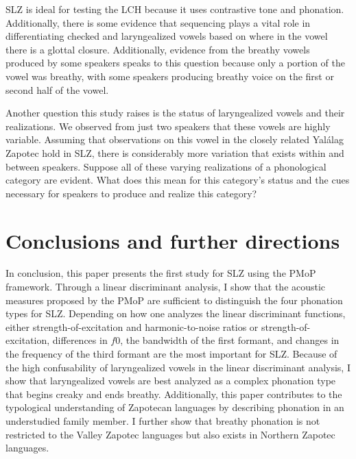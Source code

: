 \documentclass[12pt, letterpaper]{article}
\begin{document}
SLZ is ideal for testing the LCH because it uses contrastive tone and phonation. Additionally, there is some evidence that sequencing plays a vital role in differentiating checked and laryngealized vowels based on where in the vowel there is a glottal closure. Additionally, evidence from the breathy vowels produced by some speakers speaks to this question because only a portion of the vowel was breathy, with some speakers producing breathy voice on the first or second half of the vowel. 

Another question this study raises is the status of laryngealized vowels and their realizations. We observed from just two speakers that these vowels are highly variable. Assuming that  observations on this vowel in the closely related Yalálag Zapotec hold in SLZ, there is considerably more variation that exists within and between speakers. Suppose all of these varying realizations of a phonological category are evident. What does this mean for this category's status and the cues necessary for speakers to produce and realize this category? 

\section{Conclusions and further directions } \label{sec:Conclusion}

In conclusion, this paper presents the first study for SLZ using the PMoP framework. Through a linear discriminant analysis, I show that the acoustic measures proposed by the PMoP are sufficient to distinguish the four phonation types for SLZ. Depending on how one analyzes the linear discriminant functions, either strength-of-excitation and harmonic-to-noise ratios or strength-of-excitation, differences in $f0$, the bandwidth of the first formant, and changes in the frequency of the third formant are the most important for SLZ. Because of the high confusability of laryngealized vowels in the linear discriminant analysis, I show that laryngealized vowels are best analyzed as a complex phonation type that begins creaky and ends breathy. Additionally, this paper contributes to the typological understanding of Zapotecan languages by describing phonation in an understudied family member. I further show that breathy phonation is not restricted to the Valley Zapotec languages but also exists in Northern Zapotec languages. 
\end{document}
